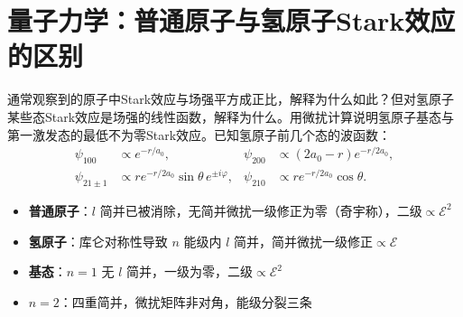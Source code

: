 \section{量子力学：普通原子与氢原子Stark效应的区别}
\label{sec:stark-effect-hydrogen}

\begin{modelbox}[题目：普通原子与氢原子Stark效应的区别]
通常观察到的原子中Stark效应与场强平方成正比，解释为什么如此？但对氢原子某些态Stark效应是场强的线性函数，解释为什么。用微扰计算说明氢原子基态与第一激发态的最低不为零Stark效应。已知氢原子前几个态的波函数：
\begin{align*}
\psi_{100}&\propto e^{-r/a_0},&\psi_{200}&\propto(2a_0-r)e^{-r/2a_0},\\
\psi_{21\pm1}&\propto re^{-r/2a_0}\sin\theta\,e^{\pm i\varphi},&\psi_{210}&\propto re^{-r/2a_0}\cos\theta.
\end{align*}
\end{modelbox}

\begin{tipbox}[考点快速分析]
\begin{itemize}
    \item \textbf{普通原子}：$l$ 简并已被消除，无简并微扰一级修正为零（奇宇称），二级$\propto\mathcal{E}^2$
    \item \textbf{氢原子}：库仑对称性导致 $n$ 能级内 $l$ 简并，简并微扰一级修正$\propto\mathcal{E}$
    \item \textbf{基态}：$n=1$ 无 $l$ 简并，一级为零，二级$\propto\mathcal{E}^2$
    \item \textbf{$n=2$}：四重简并，微扰矩阵非对角，能级分裂三条
\end{itemize}
\end{tipbox}

